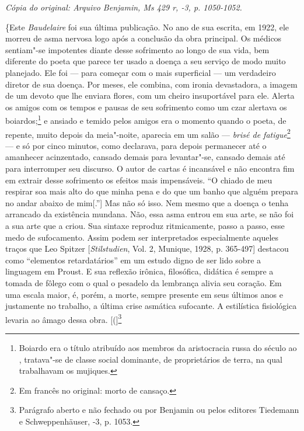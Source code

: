 \begin{flushright}
\emph{\small{Cópia do original: Arquivo Benjamin, Ms 429 r, -3, p. 1050-1052.}}
\end{flushright}

\{Este \emph{Baudelaire} foi sua última publicação. No ano de sua
escrita, em 1922, ele morreu de asma nervosa logo após a conclusão da
obra principal. Os médicos sentiam"-se impotentes diante desse
sofrimento ao longo de sua vida, bem diferente do poeta que parece ter
usado a doença a seu serviço de modo muito planejado. Ele foi --- para
começar com o mais superficial --- um verdadeiro diretor de sua doença.
Por meses, ele combina, com ironia devastadora, a imagem de um devoto que
lhe enviara flores, com um cheiro insuportável para ele. Alerta os
amigos com os tempos e pausas de seu sofrimento como um czar alertava os
boiardos;\footnote{Boiardo era o título atribuído aos membros da
  aristocracia russa do século  ao , tratava"-se de classe social
  dominante, de proprietários de terra, na qual trabalhavam os mujiques. \versal{[N. E.]}}
e ansiado e temido pelos amigos era o momento quando o poeta, de
repente, muito depois da meia"-noite, aparecia em um salão --- \emph{brisé
de fatigue}\footnote{Em francês no original: morto de cansaço. \versal{[N. T.]}}
--- e só por cinco minutos, como declarava, para depois permanecer até o
amanhecer acinzentado, cansado demais para levantar"-se, cansado demais
até para interromper seu discurso. O autor de cartas é incansável e não
encontra fim em extrair desse sofrimento os efeitos mais impensáveis. ``O
chiado de meu respirar soa mais alto do que minha pena e do que um banho
que alguém prepara no andar abaixo de mim{[}.''{]} Mas não só isso. Nem
mesmo que a doença o tenha arrancado da existência mundana. Não, essa
asma entrou em sua arte, se não foi a sua arte que a criou. Sua sintaxe
reproduz ritmicamente, passo a passo, esse medo de sufocamento. Assim
podem ser interpretados especialmente aqueles traços que Leo Spitzer
{[}\emph{Stilstudien}, Vol. 2, Munique, 1928, p. 365-497{]} destacou como
``elementos retardatários'' em um estudo digno de ser lido sobre a
linguagem em Proust. E sua reflexão irônica, filosófica, didática é
sempre a tomada de fôlego com o qual o pesadelo da lembrança alivia seu
coração. Em uma escala maior, é, porém, a morte, sempre presente em seus
últimos anos e justamente no trabalho, a última crise asmática
sufocante. A estilística fisiológica levaria ao âmago dessa obra. {[}({]}\footnote{Parágrafo aberto e não fechado ou por Benjamin ou pelos
  editores Tiedemann e Schweppenhäuser, -3, p. 1053. \versal{[N. T.]}}
